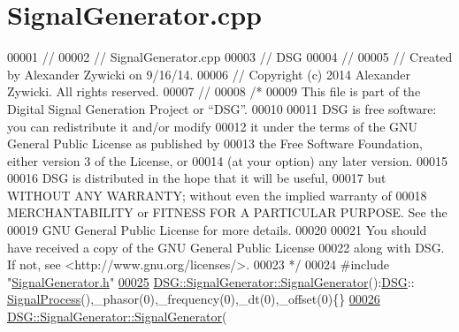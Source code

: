 \hypertarget{_signal_generator_8cpp_source}{\section{Signal\+Generator.\+cpp}
\label{_signal_generator_8cpp_source}
}

\begin{DoxyCode}
00001 \textcolor{comment}{//}
00002 \textcolor{comment}{//  SignalGenerator.cpp}
00003 \textcolor{comment}{//  DSG}
00004 \textcolor{comment}{//}
00005 \textcolor{comment}{//  Created by Alexander Zywicki on 9/16/14.}
00006 \textcolor{comment}{//  Copyright (c) 2014 Alexander Zywicki. All rights reserved.}
00007 \textcolor{comment}{//}
00008 \textcolor{comment}{/*}
00009 \textcolor{comment}{ This file is part of the Digital Signal Generation Project or “DSG”.}
00010 \textcolor{comment}{}
00011 \textcolor{comment}{ DSG is free software: you can redistribute it and/or modify}
00012 \textcolor{comment}{ it under the terms of the GNU General Public License as published by}
00013 \textcolor{comment}{ the Free Software Foundation, either version 3 of the License, or}
00014 \textcolor{comment}{ (at your option) any later version.}
00015 \textcolor{comment}{}
00016 \textcolor{comment}{ DSG is distributed in the hope that it will be useful,}
00017 \textcolor{comment}{ but WITHOUT ANY WARRANTY; without even the implied warranty of}
00018 \textcolor{comment}{ MERCHANTABILITY or FITNESS FOR A PARTICULAR PURPOSE.  See the}
00019 \textcolor{comment}{ GNU General Public License for more details.}
00020 \textcolor{comment}{}
00021 \textcolor{comment}{ You should have received a copy of the GNU General Public License}
00022 \textcolor{comment}{ along with DSG.  If not, see <http://www.gnu.org/licenses/>.}
00023 \textcolor{comment}{ */}
00024 \textcolor{preprocessor}{#include "\hyperlink{_signal_generator_8h}{SignalGenerator.h}"}
\hypertarget{_signal_generator_8cpp_source_l00025}{}\hyperlink{class_d_s_g_1_1_signal_generator_a13ebda67fcdc880ef41aff501cc23fc3}{00025} \hyperlink{class_d_s_g_1_1_signal_generator_a13ebda67fcdc880ef41aff501cc23fc3}{DSG::SignalGenerator::SignalGenerator}():\hyperlink{namespace_d_s_g}{DSG}::
      \hyperlink{class_d_s_g_1_1_signal_process}{SignalProcess}(),\_phasor(0),\_frequency(0),\_dt(0),\_offset(0)\{\}
\hypertarget{_signal_generator_8cpp_source_l00026}{}\hyperlink{class_d_s_g_1_1_signal_generator_a4036fceff5c05a3711b8516d850c414c}{00026} \hyperlink{class_d_s_g_1_1_signal_generator_a13ebda67fcdc880ef41aff501cc23fc3}{DSG::SignalGenerator::SignalGenerator}(

\end{DoxyCode}
